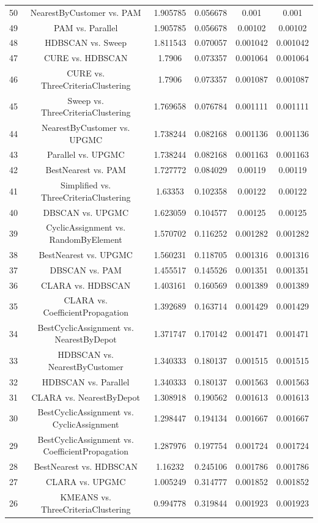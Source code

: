 \documentclass[a4paper,10pt]{article}
\begin{document}
\begin{landscape}
\begin{table}[!htp]
\begin{tabular}{cccccc}
50&NearestByCustomer vs. PAM&1.905785&0.056678&0.001&0.001\\
49&PAM vs. Parallel&1.905785&0.056678&0.00102&0.00102\\
48&HDBSCAN vs. Sweep&1.811543&0.070057&0.001042&0.001042\\
47&CURE vs. HDBSCAN&1.7906&0.073357&0.001064&0.001064\\
46&CURE vs. ThreeCriteriaClustering&1.7906&0.073357&0.001087&0.001087\\
45&Sweep vs. ThreeCriteriaClustering&1.769658&0.076784&0.001111&0.001111\\
44&NearestByCustomer vs. UPGMC&1.738244&0.082168&0.001136&0.001136\\
43&Parallel vs. UPGMC&1.738244&0.082168&0.001163&0.001163\\
42&BestNearest vs. PAM&1.727772&0.084029&0.00119&0.00119\\
41&Simplified vs. ThreeCriteriaClustering&1.63353&0.102358&0.00122&0.00122\\
40&DBSCAN vs. UPGMC&1.623059&0.104577&0.00125&0.00125\\
39&CyclicAssignment vs. RandomByElement&1.570702&0.116252&0.001282&0.001282\\
38&BestNearest vs. UPGMC&1.560231&0.118705&0.001316&0.001316\\
37&DBSCAN vs. PAM&1.455517&0.145526&0.001351&0.001351\\
36&CLARA vs. HDBSCAN&1.403161&0.160569&0.001389&0.001389\\
35&CLARA vs. CoefficientPropagation&1.392689&0.163714&0.001429&0.001429\\
34&BestCyclicAssignment vs. NearestByDepot&1.371747&0.170142&0.001471&0.001471\\
33&HDBSCAN vs. NearestByCustomer&1.340333&0.180137&0.001515&0.001515\\
32&HDBSCAN vs. Parallel&1.340333&0.180137&0.001563&0.001563\\
31&CLARA vs. NearestByDepot&1.308918&0.190562&0.001613&0.001613\\
30&BestCyclicAssignment vs. CyclicAssignment&1.298447&0.194134&0.001667&0.001667\\
29&BestCyclicAssignment vs. CoefficientPropagation&1.287976&0.197754&0.001724&0.001724\\
28&BestNearest vs. HDBSCAN&1.16232&0.245106&0.001786&0.001786\\
27&CLARA vs. UPGMC&1.005249&0.314777&0.001852&0.001852\\
26&KMEANS vs. ThreeCriteriaClustering&0.994778&0.319844&0.001923&0.001923\\

\end{tabular}
\end{table}
\end{landscape}
\end{document}
